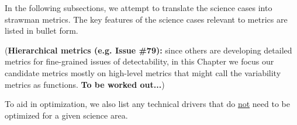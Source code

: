 %



In the following subsections, we attempt to translate the science cases
into strawman metrics. The key features of the science cases relevant
to metrics are listed in bullet form.

({\bf Hierarchical metrics (e.g. Issue \#79):} since others are
developing detailed metrics for fine-grained issues of detectability,
in this Chapter we focus our candidate metrics mostly on high-level
metrics that might call the variability metrics as functions. {\bf To
  be worked out...})


To aid in optimization, we also list any technical drivers that do
\underline{not} need to be optimized for a given science area.

